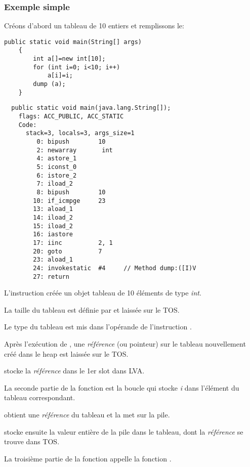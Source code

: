 \subsubsection{Exemple simple}

Créons d'abord un tableau de 10 entiers et remplissons le:

\begin{lstlisting}[style=customjava]
	public static void main(String[] args) 
	{
		int a[]=new int[10];
		for (int i=0; i<10; i++)
			a[i]=i;
		dump (a);
	}
\end{lstlisting}

\begin{lstlisting}
  public static void main(java.lang.String[]);
    flags: ACC_PUBLIC, ACC_STATIC
    Code:
      stack=3, locals=3, args_size=1
         0: bipush        10
         2: newarray       int
         4: astore_1      
         5: iconst_0      
         6: istore_2      
         7: iload_2       
         8: bipush        10
        10: if_icmpge     23
        13: aload_1       
        14: iload_2       
        15: iload_2       
        16: iastore       
        17: iinc          2, 1
        20: goto          7
        23: aload_1       
        24: invokestatic  #4     // Method dump:([I)V
        27: return        
\end{lstlisting}

L'instruction  créée un objet tableau de 10 éléments de type \emph{int}.

La taille du tableau est définie par  et laissée sur le \ac{TOS}.

Le type du tableau est mis dans l'opérande de l'instruction .

Après l'exécution de , une \emph{référence} (ou pointeur) sur le tableau
nouvellement créé dans le heap est laissée sur le \ac{TOS}.

 stocke la \emph{référence} dans le 1er slot dans \ac{LVA}.

La seconde partie de la fonction \main est la boucle qui stocke \emph{i} dans l'élément
du tableau correspondant.

 obtient une \emph{référence} du tableau et la met sur la pile.

 stocke ensuite la valeur entière de la pile dans le tableau, dont la
\emph{référence} se trouve dans \ac{TOS}.

La troisième partie de la fonction \main appelle la fonction .

